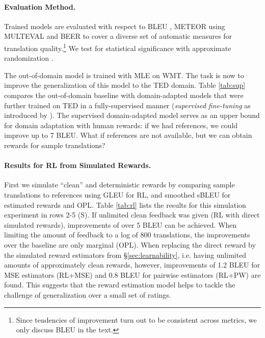\paragraph{Evaluation Method.} Trained models are evaluated with respect to BLEU \cite{PapineniETAL:02}, METEOR \cite{DenkowskiLavie:11} using MULTEVAL \cite{ClarkETAL:11} and BEER  \cite{StanojevicSimaan:14} to cover a diverse set of automatic measures for translation quality.\footnote{Since tendencies of improvement turn out to be consistent across metrics, we only discuss BLEU in the text.} We test for statistical significance with approximate randomization \cite{Noreen:89}.

The out-of-domain model is trained with MLE on WMT. The task is now to improve the generalization of this model to the TED domain. Table \ref{tab:sup} compares the out-of-domain baseline with domain-adapted models that were further trained on TED in a fully-supervised manner (\emph{supervised fine-tuning} as introduced by \citet{FreitagETAL:16, LuongManning:15}). The supervised domain-adapted model serves as an upper bound for domain adaptation with human rewards: if we had references, we could improve up to 7 BLEU. What if references are not available, but we can obtain rewards for sample translations?  

\paragraph{Results for RL from Simulated Rewards.} First we simulate ``clean'' and deterministic rewards by comparing sample translations to references using GLEU \cite{WuETAL:16} for RL, and smoothed sBLEU for estimated rewards and OPL. Table \ref{tab:rl} lists the results for this simulation experiment in rows 2-5 (S). If unlimited clean feedback was given (RL with direct simulated rewards), improvements of over 5 BLEU can be achieved. When limiting the amount of feedback to a log of 800 translations, the improvements over the baseline are only marginal (OPL). When replacing the direct reward by the simulated reward estimators from §\ref{sec:learnability}, i.e. having unlimited amounts of approximately clean rewards, however, improvements of 1.2 BLEU for MSE estimators (RL+MSE) and 0.8 BLEU for pairwise estimators (RL+PW) are found. This suggests that the reward estimation model helps to tackle the challenge of generalization over a small set of ratings.

